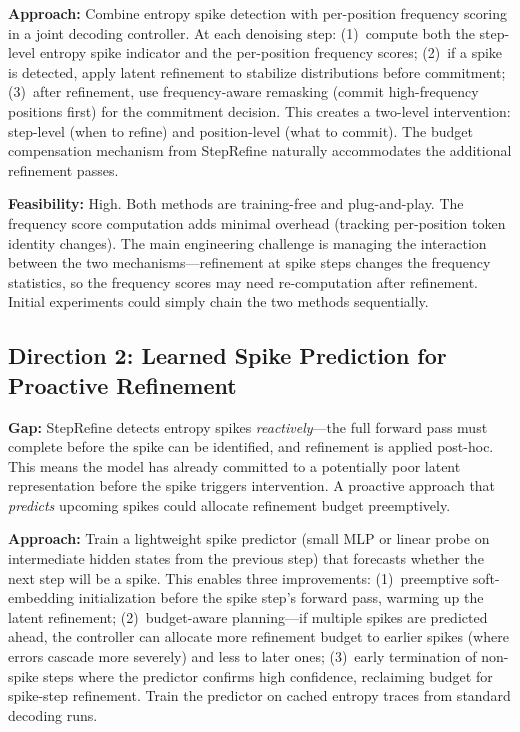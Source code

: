 \documentclass[11pt,a4paper]{article}
\begin{document}
\textbf{Approach:} Combine entropy spike detection with per-position frequency scoring in a joint decoding controller. At each denoising step: (1)~compute both the step-level entropy spike indicator and the per-position frequency scores; (2)~if a spike is detected, apply latent refinement to stabilize distributions before commitment; (3)~after refinement, use frequency-aware remasking (commit high-frequency positions first) for the commitment decision. This creates a two-level intervention: step-level (when to refine) and position-level (what to commit). The budget compensation mechanism from StepRefine naturally accommodates the additional refinement passes.

\textbf{Feasibility:} High. Both methods are training-free and plug-and-play. The frequency score computation adds minimal overhead (tracking per-position token identity changes). The main engineering challenge is managing the interaction between the two mechanisms---refinement at spike steps changes the frequency statistics, so the frequency scores may need re-computation after refinement. Initial experiments could simply chain the two methods sequentially.

\subsection{Direction 2: Learned Spike Prediction for Proactive Refinement}
\textbf{Gap:} StepRefine detects entropy spikes \emph{reactively}---the full forward pass must complete before the spike can be identified, and refinement is applied post-hoc. This means the model has already committed to a potentially poor latent representation before the spike triggers intervention. A proactive approach that \emph{predicts} upcoming spikes could allocate refinement budget preemptively.

\textbf{Approach:} Train a lightweight spike predictor (small MLP or linear probe on intermediate hidden states from the previous step) that forecasts whether the next step will be a spike. This enables three improvements: (1)~preemptive soft-embedding initialization before the spike step's forward pass, warming up the latent refinement; (2)~budget-aware planning---if multiple spikes are predicted ahead, the controller can allocate more refinement budget to earlier spikes (where errors cascade more severely) and less to later ones; (3)~early termination of non-spike steps where the predictor confirms high confidence, reclaiming budget for spike-step refinement. Train the predictor on cached entropy traces from standard decoding runs.
\end{document}
